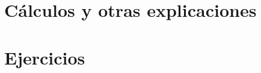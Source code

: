 \documentclass[palatino, bibnumbers]{apuntes}
\begin{document}
\appendix

\chapter{Cálculos y otras explicaciones}


\chapter{Ejercicios}



{}
\printindex
\end{document}
